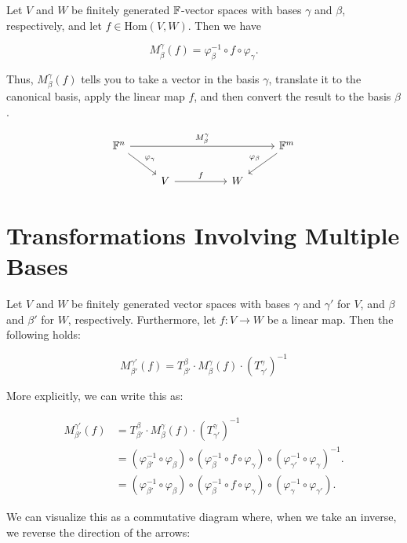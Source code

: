 Let \( V \) and \( W \) be finitely generated \( \mathbb{F}\)-vector spaces with bases \(\gamma\) and \(\beta\), respectively, and let \( f \in \mathrm{Hom}(V, W) \).
Then we have

\[
    M_\beta^\gamma(f) = \varphi_\beta^{-1} \circ f \circ \varphi_\gamma.
\]

Thus, \( M_\beta^\gamma(f) \) tells you to take a vector in the basis \(\gamma\), translate it to the canonical basis,
apply the linear map \(f\), and then convert the result to the basis \(\beta\).

\[
    \begin{tikzcd}
        \field^n \arrow[rrrr, "M_{\beta}^{\gamma}"] \arrow[rd, "\varphi_\gamma"] &  &  &   & \field^m \arrow[ld, "\varphi_\beta"'] \\
        & V \arrow[rr, "f"] &  & W &
    \end{tikzcd}
\]


\section{Transformations Involving Multiple Bases}

Let \( V \) and \( W \) be finitely generated vector spaces with bases \(\gamma\) and \( \gamma' \)
for \( V \), and \(\beta\) and \( \beta' \) for \( W \), respectively.  Furthermore, let \( f: V \to W \) be
a linear map. Then the following holds:

\[
    M_{\beta'}^{\gamma'}(f) = T_{\beta'}^{\beta} \cdot M_{\beta}^{\gamma}(f) \cdot {\left( T_{\gamma'}^{\gamma} \right)}^{-1}
\]

More explicitly, we can write this as:

\begin{align*}
    M_{\beta'}^{\gamma'}(f) & = T_{\beta'}^{\beta} \cdot M_{\beta}^{\gamma}(f) \cdot {\left( T_{\gamma'}^{\gamma} \right)}^{-1}                                                                         \\
                            & = (\varphi_{\beta'}^{-1} \circ \varphi_{\beta}) \circ   (\varphi_{\beta}^{-1} \circ f \circ \varphi_{\gamma}) \circ ( \varphi_{\gamma'}^{-1} \circ \varphi_\gamma )^{-1}. \\
                            & = (\varphi_{\beta'}^{-1} \circ \varphi_{\beta}) \circ   (\varphi_{\beta}^{-1} \circ f \circ \varphi_{\gamma}) \circ ( \varphi_{\gamma}^{-1} \circ \varphi_{\gamma'}).
\end{align*}

We can visualize this as a commutative diagram where, when we take an inverse, we reverse the direction of the arrows:

